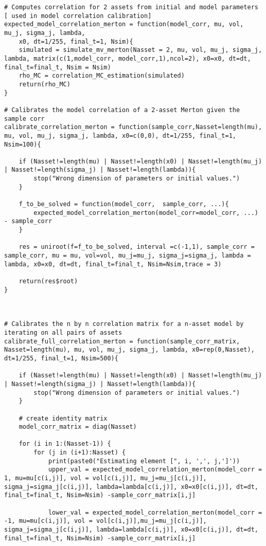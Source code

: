 \begin{lstlisting}
# Computes correlation for 2 assets from initial and model parameters [ used in model correlation calibration]
expected_model_correlation_merton = function(model_corr, mu, vol, mu_j, sigma_j, lambda,
	x0, dt=1/255, final_t=1, Nsim){
	simulated = simulate_mv_merton(Nasset = 2, mu, vol, mu_j, sigma_j, lambda, matrix(c(1,model_corr, model_corr,1),ncol=2), x0=x0, dt=dt, final_t=final_t, Nsim = Nsim)
	rho_MC = correlation_MC_estimation(simulated)
	return(rho_MC)
}

# Calibrates the model correlation of a 2-asset Merton given the sample corr
calibrate_correlation_merton = function(sample_corr,Nasset=length(mu), mu, vol, mu_j, sigma_j, lambda, x0=c(0,0), dt=1/255, final_t=1, Nsim=100){

	if (Nasset!=length(mu) | Nasset!=length(x0) | Nasset!=length(mu_j) | Nasset!=length(sigma_j) | Nasset!=length(lambda)){
		stop("Wrong dimension of parameters or initial values.")
	}
	
	f_to_be_solved = function(model_corr,  sample_corr, ...){
		expected_model_correlation_merton(model_corr=model_corr, ...) - sample_corr
	}
	
	res = uniroot(f=f_to_be_solved, interval =c(-1,1), sample_corr = sample_corr, mu = mu, vol=vol, mu_j=mu_j, sigma_j=sigma_j, lambda = lambda, x0=x0, dt=dt, final_t=final_t, Nsim=Nsim,trace = 3)
	
	return(res$root)
}



# Calibrates the n by n correlation matrix for a n-asset model by iterating on all pairs of assets
calibrate_full_correlation_merton = function(sample_corr_matrix, Nasset=length(mu), mu, vol, mu_j, sigma_j, lambda, x0=rep(0,Nasset), dt=1/255, final_t=1, Nsim=500){

	if (Nasset!=length(mu) | Nasset!=length(x0) | Nasset!=length(mu_j) | Nasset!=length(sigma_j) | Nasset!=length(lambda)){
		stop("Wrong dimension of parameters or initial values.")
	}
	
	# create identity matrix
	model_corr_matrix = diag(Nasset) 
	
	for (i in 1:(Nasset-1)) {
		for (j in (i+1):Nasset) {
			print(paste0("Estimating element [", i, ',', j,']'))
			upper_val = expected_model_correlation_merton(model_corr = 1, mu=mu[c(i,j)], vol = vol[c(i,j)], mu_j=mu_j[c(i,j)], sigma_j=sigma_j[c(i,j)], lambda=lambda[c(i,j)], x0=x0[c(i,j)], dt=dt, final_t=final_t, Nsim=Nsim) -sample_corr_matrix[i,j]
			
			lower_val = expected_model_correlation_merton(model_corr = -1, mu=mu[c(i,j)], vol = vol[c(i,j)],mu_j=mu_j[c(i,j)], sigma_j=sigma_j[c(i,j)], lambda=lambda[c(i,j)], x0=x0[c(i,j)], dt=dt, final_t=final_t, Nsim=Nsim) -sample_corr_matrix[i,j]
			

\end{lstlisting}
